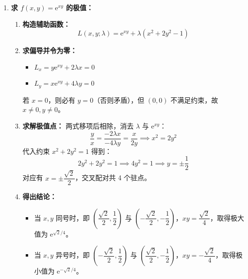 \documentclass[lang=cn,11pt]{elegantbook}
\begin{document}
\begin{solution}
\begin{enumerate}
  \item[(2)] \textbf{求 $f(x,y)=\mathrm{e}^{xy}$ 的极值：}
  \begin{enumerate}
    \item \textbf{构造辅助函数：}
    \[
    L(x,y;\lambda) = \mathrm{e}^{xy} + \lambda(x^2+2y^2-1)
    \]
    \item \textbf{求偏导并令为零：}
    \begin{itemize}
      \item $L_x = y\mathrm{e}^{xy} + 2\lambda x = 0$
      \item $L_y = x\mathrm{e}^{xy} + 4\lambda y = 0$
    \end{itemize}
    若 $x=0$，则必有 $y=0$（否则矛盾），但 $(0,0)$ 不满足约束，故 $x \neq 0, y \neq 0$。
    \item \textbf{求解极值点：}
    两式移项后相除，消去 $\lambda$ 与 $\mathrm{e}^{xy}$：
    \[
    \frac{y}{x} = \frac{-2\lambda x}{-4\lambda y} = \frac{x}{2y} \implies x^2 = 2y^2
    \]
    代入约束 $x^2+2y^2=1$ 得到：
    \[
    2y^2 + 2y^2 = 1 \implies 4y^2=1 \implies y = \pm \frac{1}{2}
    \]
    对应有 $x = \pm \dfrac{\sqrt{2}}{2}$，交叉配对共 4 个驻点。
    \item \textbf{得出结论：}
    \begin{itemize}
      \item 当 $x,y$ 同号时，即 $\left(\dfrac{\sqrt{2}}{2}, \dfrac{1}{2}\right)$ 与 $\left(-\dfrac{\sqrt{2}}{2}, -\dfrac{1}{2}\right)$，$xy = \dfrac{\sqrt{2}}{4}$，取得极大值为 $\mathrm{e}^{\sqrt{2}/4}$。
      \item 当 $x,y$ 异号时，即 $\left(-\dfrac{\sqrt{2}}{2}, \dfrac{1}{2}\right)$ 与 $\left(\dfrac{\sqrt{2}}{2}, -\dfrac{1}{2}\right)$，$xy = -\dfrac{\sqrt{2}}{4}$，取得极小值为 $\mathrm{e}^{-\sqrt{2}/4}$。
    \end{itemize}
  \end{enumerate}


\end{enumerate}
\end{solution}
\end{document}
